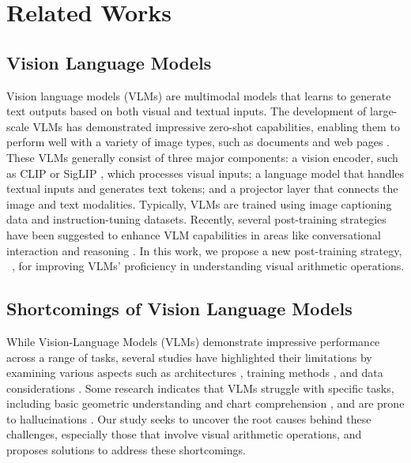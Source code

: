 \section{Related Works}


\subsection{Vision Language Models}
Vision language models (VLMs) are multimodal models that learns to generate text outputs based on both visual and textual inputs. The development of large-scale VLMs has demonstrated impressive zero-shot capabilities, enabling them to perform well with a variety of image types, such as documents and web pages \cite{liu2023llava, dai2023instructblip, Achiam2023GPT4TR, gemini, claude}. These VLMs generally consist of three major components: a vision encoder, such as CLIP \cite{Radford2021LearningTV} or SigLIP \cite{Zhai_2023_siglip}, which processes visual inputs; a language model that handles textual inputs and generates text tokens; and a projector layer that connects the image and text modalities. Typically, VLMs are trained using image captioning data and instruction-tuning datasets. Recently, several post-training strategies have been suggested to enhance VLM capabilities in areas like conversational interaction \cite{xiong2024llavaovchat} and reasoning \cite{wang2024mpo}. In this work, we propose a new post-training strategy, \method~, for improving VLMs' proficiency in understanding visual arithmetic operations. 



\subsection{Shortcomings of Vision Language Models}

While Vision-Language Models (VLMs) demonstrate impressive performance across a range of tasks, several studies have highlighted their limitations by examining various aspects such as architectures \cite{McKinzie2024MM1, Karamcheti2024Prismatic, Tong_2024_eyes, shi2025when}, training methods \cite{laurencon2024what}, and data considerations \cite{udandarao2024no, gadre2024datacomp,zhang2024why,wei2024slow}. Some research indicates that VLMs struggle with specific tasks, including basic geometric understanding \cite{gao2023gllava,ullman2024illusion} and chart comprehension \cite{huang-etal-2024-lvlms}, and are prone to hallucinations \cite{qiu2024valor}.  Our study seeks to uncover the root causes behind these challenges, especially those that involve visual arithmetic operations, and proposes solutions to address these shortcomings.  
